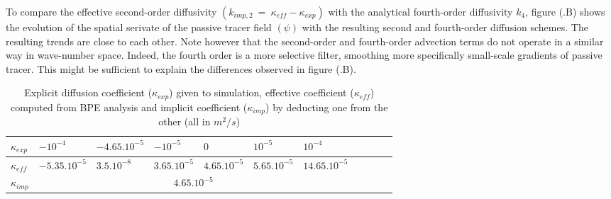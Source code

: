 To compare the effective second-order diffusivity $(k_{imp,2}\ =\ \kappa_{eff}-\kappa_{exp})$ with the analytical fourth-order diffusivity $k_4$, figure (.B) shows the evolution of the spatial serivate of the passive tracer field $(\psi)$ with the resulting second and fourth-order diffusion schemes. The resulting trends are close to each other.
Note however that the second-order and fourth-order advection terms do not operate in a similar way in wave-number space. Indeed, the fourth order is a more selective filter, smoothing more specifically small-scale gradients of passive tracer. This might be sufficient to explain the differences observed in figure (.B).
\begin{table}[h!]
\centering
\begin{tabular}{|l|l|l|l|l|l|l|l|l|l|l|}
\hline
$\kappa_{exp}$ & $-10^{-4}$ &$-4.65.10^{-5}$ & $-10^{-5}$& $0$& $10^{-5}$& $10^{-4}$\\
\hline
$\kappa_{eff}$ & $-5.35.10^{-5}$ &$3.5.10^{-8}$ & $3.65.10^{-5}$& $4.65.10^{-5}$& $5.65.10^{-5}$& $14.65.10^{-5}$\\
\hline
$\kappa_{imp}$&\multicolumn{6}{c|}{$4.65.10^{-5}$}\\
\hline
\end{tabular}
\caption{Explicit diffusion coefficient ($\kappa_{exp}$) given to simulation, effective coefficient ($\kappa_{eff}$) computed from BPE analysis and implicit coefficient ($\kappa_{imp}$) by deducting one from the other (all in $m^2/s$)}
\label{table_kappa}
\end{table}

